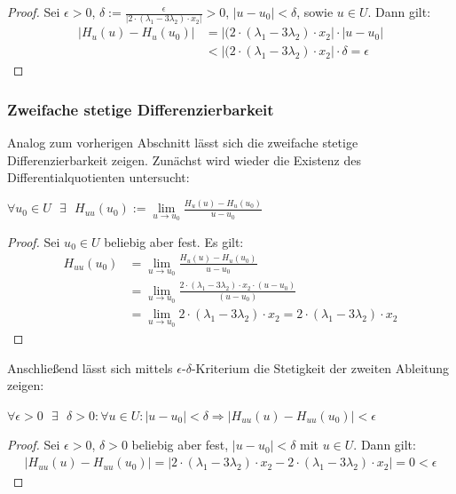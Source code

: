 \begin{proof}
	Sei $\epsilon>0$, $\delta:=\frac{\epsilon}{|2\cdot(\lambda_1-3\lambda_2)\cdot x_2|}>0$, $|u-u_0|<\delta$, sowie $u \in U$. Dann gilt:
	\begin{align}
	|H_u(u) - H_u(u_0)| 
	& = |(2 \cdot (\lambda_1-3\lambda_2) \cdot x_2| \cdot |u-u_0|\\
	& < |(2 \cdot (\lambda_1-3\lambda_2) \cdot x_2| \cdot \delta 
	= \epsilon 
	\end{align}
\end{proof}
\subsubsection*{Zweifache stetige Differenzierbarkeit}
Analog zum vorherigen Abschnitt lässt sich die zweifache stetige Differenzierbarkeit zeigen. Zunächst wird wieder die Existenz des Differentialquotienten untersucht:
\begin{zz}
$\forall u_0 \in U \text{ } \exists \text{ } H_{uu}(u_0) := \lim\limits_{u \rightarrow u_0} \frac{H_u(u)-H_u(u_0)}{u-u_0}$
\end{zz}
\begin{proof}
Sei $u_0 \in U$ beliebig aber fest. Es gilt:
	\begin{align}
		H_{uu}(u_0) &= \lim\limits_{u \rightarrow u_0} \frac{H_u(u)-H_u(u_0)}{u-u_0} \\
		& = \lim\limits_{u \rightarrow u_0} \frac{2 \cdot (\lambda_1 - 3 \lambda_2) \cdot x_2 \cdot (u-u_0)}{(u-u_0)} \\
		& = \lim\limits_{u \rightarrow u_0} 2 \cdot (\lambda_1 - 3 \lambda_2) \cdot x_2 
		= 2 \cdot (\lambda_1 - 3 \lambda_2) \cdot x_2
	\end{align}
\end{proof}
Anschließend lässt sich mittels $\epsilon$-$\delta$-Kriterium die Stetigkeit der zweiten Ableitung zeigen: 
\begin{zz}
$ \forall\epsilon>0 \text{ } \exists \text{ } \delta>0: \forall u\in U: |u-u_0|<\delta \Rightarrow |H_{uu}(u)-H_{uu}(u_0)| < \epsilon $
\end{zz} 
\begin{proof}
	Sei $\epsilon>0$, $\delta>0$ beliebig aber fest, $|u-u_0|<\delta$ mit $u \in U$. Dann gilt:
	\begin{align}
	|H_{uu}(u)-H_{uu}(u_0)| 
	= |2\cdot(\lambda_1-3\lambda_2)\cdot x_2 -2\cdot(\lambda_1-3\lambda_2) \cdot x_2| 
	= 0 
	< \epsilon
	\end{align}
\end{proof}